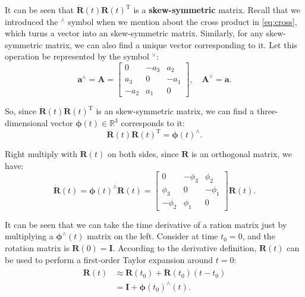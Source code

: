 It can be seen that $\dot{\mathbf{R}} (t) \mathbf{R} {(t)^\mathrm{T}}$ is a \textbf{skew-symmetric} matrix. Recall that we introduced the $^\wedge$ symbol when we mention about the cross product in \eqref{eq:cross}, which turns a vector into an skew-symmetric matrix. Similarly, for any skew-symmetric matrix, we can also find a unique vector corresponding to it. Let this operation be represented by the symbol $^{\vee}$:
\begin{equation}
{\mathbf{a}^ \wedge } = \mathbf{A} = \left[ {\begin{array}{*{20}{c}}
    0&{ - {a_3}}&{{a_2}}\\
    {{a_3}}&0&{ - {a_1}}\\
    { - {a_2}}&{{a_1}}&0
    \end{array}} \right], \quad
{ \mathbf{A}^ \vee } = \mathbf{a}.
\end{equation}

So, since $\dot{\mathbf{R}} (t) \mathbf{R} {(t)^\mathrm{T}}$ is an skew-symmetric matrix, we can find a three-dimensional vector $\boldsymbol{\phi} (t) \in \mathbb{R}^3$ corresponds to it:
\[
\dot{\mathbf{R}} (t) \mathbf{R}(t)^\mathrm{T} = \boldsymbol{\phi} (t) ^ {\wedge}.
\]

Right multiply with $\mathbf{R}(t)$ on both sides, since $\mathbf{R}$ is an orthogonal matrix, we have:
\begin{equation}
\label{eq:dR}
\dot{\mathbf{R}} (t) = \boldsymbol{\phi} (t)^{\wedge} \mathbf{R}(t) =
\left[ {\begin{array}{*{20}{c}}
    0&{ - {\phi _3}}&{{\phi _2}}\\
    {{\phi _3}}&0&{ - {\phi _1}}\\
    { - {\phi _2}}&{{\phi _1}}&0
    \end{array}} \right] \mathbf{R} (t).
\end{equation}

It can be seen that we can take the time derivative of a ration matrix just by multiplying a $\boldsymbol{\phi}^\wedge (t)$ matrix on the left. Consider at time $t_0=0$, and the rotation matrix is $\mathbf{R}(0) = \mathbf{I}$. According to the derivative definition, $\mathbf{R}(t)$ can be used to perform a first-order Taylor expansion around $t=0$:
\begin{equation}
\begin{aligned}
\mathbf{R} \left( t \right) & \approx \mathbf{R} \left( t_0 \right) + \dot {\mathbf{R}} \left( {{t_0}} \right)\left ( {t - {t_0}} \right)\\
&= \mathbf{I} + \boldsymbol{\phi} {\left( {{t_0}} \right)^ \wedge } \left( t \right).
\end{aligned}
\end{equation}

